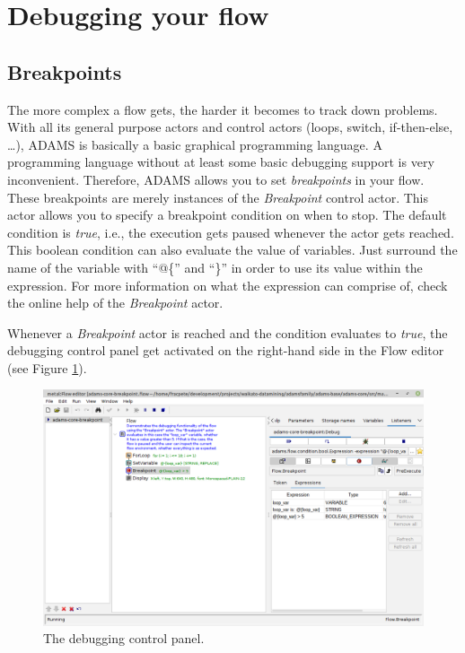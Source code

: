 \newpage
\section{Debugging your flow}
\label{debugging_flow}
\subsection{Breakpoints}
The more complex a flow gets, the harder it becomes to track down problems. With
all its general purpose actors and control actors (loops, switch, if-then-else,
\ldots), ADAMS is basically a basic graphical programming language. A
programming language without at least some basic debugging support is very
inconvenient. Therefore, ADAMS allows you to set \textit{breakpoints} in your
flow. These breakpoints are merely instances of the \textit{Breakpoint} control
actor. This actor allows you to specify a breakpoint condition on when to stop.
The default condition is \textit{true}, i.e., the execution gets paused whenever
the actor gets reached. This boolean condition can also evaluate the value of
variables. Just surround the name of the variable with ``@\{'' and ``\}'' in
order to use its value within the expression. For more information on what the
expression can comprise of, check the online help of the \textit{Breakpoint}
actor.

Whenever a \textit{Breakpoint} actor is reached and the condition evaluates to
\textit{true}, the debugging control panel get activated on the right-hand side
in the Flow editor (see Figure \ref{floweditor-debugging1_controlpanel}).
\begin{figure}[htb]
  \centering
  \includegraphics[width=12.0cm]{images/floweditor-debugging1_controlpanel.png}
  \caption{The debugging control panel.}
  \label{floweditor-debugging1_controlpanel}
\end{figure}

